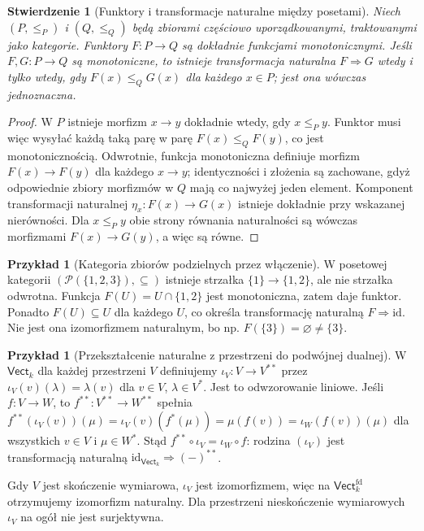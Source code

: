\documentclass[11pt,a4paper]{article}
\numberwithin{equation}{section}
\theoremstyle{plain}
\newtheorem{stwierdzenie}[twierdzenie]{Stwierdzenie}
\theoremstyle{definition}
\newtheorem{przyklad}[twierdzenie]{Przykład}
\theoremstyle{remark}
\newcommand{\cat}[1]{\mathsf{#1}}
\newcommand{\Vect}{\cat{Vect}}
\newcommand{\id}{\mathrm{id}}
\begin{document}
\begin{stwierdzenie}[Funktory i transformacje naturalne między posetami]\label{tw:fun-posety}
Niech $(P,\le_P)$ i $(Q,\le_Q)$ będą zbiorami częściowo uporządkowanymi, traktowanymi jako kategorie. Funktory $F:P\to Q$ są dokładnie funkcjami monotonicznymi. Jeśli $F,G:P\to Q$ są monotoniczne, to istnieje transformacja naturalna $F\Rightarrow G$ wtedy i tylko wtedy, gdy $F(x)\le_Q G(x)$ dla każdego $x\in P$; jest ona wówczas jednoznaczna.
\end{stwierdzenie}
\begin{proof}
W $P$ istnieje morfizm $x\to y$ dokładnie wtedy, gdy $x\le_P y$. Funktor musi więc wysyłać każdą taką parę w parę $F(x)\le_Q F(y)$, co jest monotonicznością. Odwrotnie, funkcja monotoniczna definiuje morfizm $F(x)\to F(y)$ dla każdego $x\to y$; identyczności i złożenia są zachowane, gdyż odpowiednie zbiory morfizmów w $Q$ mają co najwyżej jeden element. Komponent transformacji naturalnej $\eta_x:F(x)\to G(x)$ istnieje dokładnie przy wskazanej nierówności. Dla $x\le_P y$ obie strony równania naturalności są wówczas morfizmami $F(x)\to G(y)$, a więc są równe.
\end{proof}

\begin{przyklad}[Kategoria zbiorów podzielnych przez włączenie]
W posetowej kategorii $(\mathcal P(\{1,2,3\}),\subseteq)$ istnieje strzałka $\{1\}\to\{1,2\}$, ale nie strzałka odwrotna. Funkcja $F(U)=U\cap\{1,2\}$ jest monotoniczna, zatem daje funktor. Ponadto $F(U)\subseteq U$ dla każdego $U$, co określa transformację naturalną $F\Rightarrow\id$. Nie jest ona izomorfizmem naturalnym, bo np. $F(\{3\})=\varnothing\neq\{3\}$.
\end{przyklad}

\begin{przyklad}[Przekształcenie naturalne z przestrzeni do podwójnej dualnej]\label{przyklad:podwojny-dual}
W $\Vect_k$ dla każdej przestrzeni $V$ definiujemy $\iota_V:V\to V^{**}$ przez $\iota_V(v)(\lambda)=\lambda(v)$ dla $v\in V$, $\lambda\in V^*$. Jest to odwzorowanie liniowe. Jeśli $f:V\to W$, to $f^{**}:V^{**}\to W^{**}$ spełnia
$f^{**}(\iota_V(v))(\mu)=\iota_V(v)(f^*(\mu))=\mu(f(v))=\iota_W(f(v))(\mu)$
dla wszystkich $v\in V$ i $\mu\in W^*$. Stąd $f^{**}\circ\iota_V=\iota_W\circ f$: rodzina $(\iota_V)$ jest transformacją naturalną $\id_{\Vect_k}\Rightarrow(-)^{**}$.

Gdy $V$ jest skończenie wymiarowa, $\iota_V$ jest izomorfizmem, więc na $\Vect_k^{\mathrm{fd}}$ otrzymujemy izomorfizm naturalny. Dla przestrzeni nieskończenie wymiarowych $\iota_V$ na ogół nie jest surjektywna.
\end{przyklad}
\end{document}
